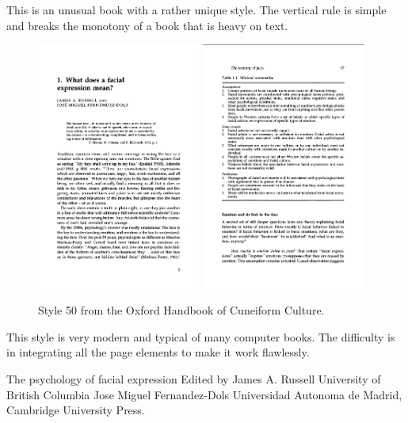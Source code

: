 This is an unusual book with a rather unique style. The vertical rule is simple and breaks the monotony of a book that is heavy on text.
\begin{figure}[ht]
\includegraphics[width=0.48\textwidth]{./chapters/chapter50}\hfill
\includegraphics[width=0.48\textwidth]{./chapters/chapter50a}
\caption{Style 50 from the Oxford Handbook of Cuneiform Culture.}
\end{figure}

This style is very modern and typical of many computer books. The difficulty is in integrating all the page elements to make it work flawlessly.

The psychology of facial
expression
Edited by
James A. Russell
University of British Columbia
Jose Miguel Fernandez-Dols
Universidad Autonoma de Madrid, Cambridge University Press.

